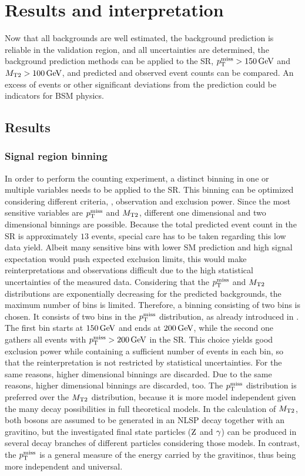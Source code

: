 \chapter{Results and interpretation}\label{chap:results}
\minitoc
Now that all backgrounds are well estimated, the background prediction is reliable in the validation region, and all uncertainties are determined, the background prediction methods can be applied to the SR, $p_{\mathrm{T}}^\text{miss}>150\,\text{Ge\hspace{-.08em}V}$ and $M_{\mathrm{T2}}>100\,\text{Ge\hspace{-.08em}V}$, and predicted and observed event counts can be compared. An excess of events or other significant deviations from the prediction could be indicators for BSM physics.
\section{Results}\label{sec:results}
\subsection*{Signal region binning}
In order to perform the counting experiment, a distinct binning in one or multiple variables needs to be applied to the SR. This binning can be optimized considering different criteria, \eg, observation and exclusion power. Since the most sensitive variables are $p_{\mathrm{T}}^\text{miss}$ and $M_{\mathrm{T2}}$, different one dimensional and two dimensional binnings are possible.
Because the total predicted event count in the SR is approximately $13$ events, special care has to be taken regarding this low data yield. Albeit many sensitive bins with lower SM prediction and high signal expectation would push expected exclusion limits, this would make reinterpretations and observations difficult due to the high statistical uncertainties of the measured data. Considering that the $p_{\mathrm{T}}^\text{miss}$ and $M_{\mathrm{T2}}$ distributions are exponentially decreasing for the predicted backgrounds, the maximum number of bins is limited. Therefore, a binning consisting of two bins is chosen. It consists of two bins in the $p_{\mathrm{T}}^\text{miss}$ distribution, as already introduced in . The first bin starts at $150\,\text{Ge\hspace{-.08em}V}$ and ends at $200\,\text{Ge\hspace{-.08em}V}$, while the second one gathers all events with $p_{\mathrm{T}}^\text{miss}>200\,\text{Ge\hspace{-.08em}V}$ in the SR. This choice yields good exclusion power while containing a sufficient number of events in each bin, so that the reinterpretation is not restricted by statistical uncertainties. For the same reasons, higher dimensional binnings are discarded. Due to the same reasons, higher dimensional binnings are discarded, too. The $p_{\mathrm{T}}^\text{miss}$ distribution is preferred over the $M_{\mathrm{T2}}$ distribution, because it is more model independent given the many decay possibilities in full theoretical models. In the calculation of $M_{\mathrm{T2}}$, both bosons are assumed to be generated in an NLSP decay together with an gravitino, but the investigated final state particles ($\mathrm{Z}$ and $\gamma$) can be produced in several decay branches of different particles considering those models. In contrast, the $p_{\mathrm{T}}^\text{miss}$ is a general measure of the energy carried by the gravitinos, thus being more independent and universal.
